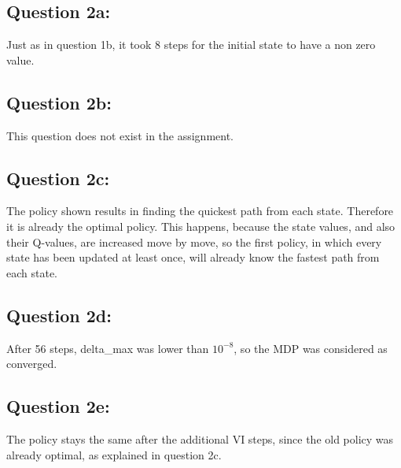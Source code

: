 \subsection*{Question 2a:}\label{sec:2a}

Just as in question 1b, it took 8 steps for the initial state to have a non zero value.

\subsection*{Question 2b:}\label{sec:2b}

This question does not exist in the assignment.

\subsection*{Question 2c:}\label{sec:2c}

The policy shown results in finding the quickest path from each state.
Therefore it is already the optimal policy.
This happens, because the state values, and also their Q-values, are increased move by move, so the first policy, in which every state has been updated at least once, will already know the fastest path from each state.

\subsection*{Question 2d:}\label{sec:2d}

After 56 steps, delta\_max was lower than $10^{-8}$, so the MDP was considered as converged.

\subsection*{Question 2e:}\label{sec:2e}

The policy stays the same after the additional VI steps, since the old policy was already optimal, as explained in question 2c.
